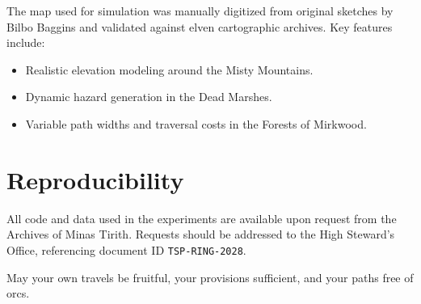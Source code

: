 \documentclass[main.tex]{subfiles}
\begin{document}
\noindent
The map used for simulation was manually digitized from original sketches by Bilbo Baggins and validated against elven cartographic archives. Key features include:
\begin{itemize}
    \item Realistic elevation modeling around the Misty Mountains.
    \item Dynamic hazard generation in the Dead Marshes.
    \item Variable path widths and traversal costs in the Forests of Mirkwood.
\end{itemize}

\section{Reproducibility}

\noindent
All code and data used in the experiments are available upon request from the Archives of Minas Tirith. Requests should be addressed to the High Steward's Office, referencing document ID \texttt{TSP-RING-2028}.

\vspace{1em}
\noindent
May your own travels be fruitful, your provisions sufficient, and your paths free of orcs.
\end{document}
